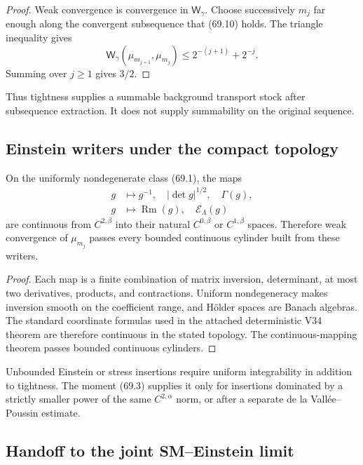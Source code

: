 \documentclass[11pt]{article}
\theoremstyle{remark}
\begin{document}
\begin{proof}
Weak convergence is convergence in
\({\mathsf W}_\gamma\).  Choose successively \(m_j\) far enough along
the convergent subsequence that (69.10) holds.  The triangle
inequality gives
\[
 {\mathsf W}_\gamma(\mu_{m_{j+1}},\mu_{m_j})
 \leq2^{-(j+1)}+2^{-j}.
\]
Summing over \(j\geq1\) gives \(3/2\).
\end{proof}

Thus tightness supplies a summable background transport stock after
subsequence extraction.  It does not supply summability on the
original sequence.

\subsection{Einstein writers under the compact topology}

On the uniformly nondegenerate class (69.1), the maps
\begin{align}
 g&\longmapsto g^{-1},\quad
 |\det g|^{1/2},\quad
 \Gamma(g),                                      \tag{69.12}\\
 g&\longmapsto
 \operatorname{Rm}(g),\quad
 \mathscr E_\Lambda(g)                            \tag{69.13}
\end{align}
are continuous from \(C^{2,\beta}\) into their natural
\(C^{0,\beta}\) or \(C^{1,\beta}\) spaces.  Therefore weak
convergence of \(\mu_{m_j}\) passes every bounded continuous
cylinder built from these writers.

\begin{proof}
Each map is a finite combination of matrix inversion, determinant,
at most two derivatives, products, and contractions.  Uniform
nondegeneracy makes inversion smooth on the coefficient range, and
Hölder spaces are Banach algebras.  The standard coordinate formulas
used in the attached deterministic V34 theorem are therefore
continuous in the stated topology.  The continuous-mapping theorem
passes bounded continuous cylinders.
\end{proof}

Unbounded Einstein or stress insertions require uniform
integrability in addition to tightness.  The moment (69.3) supplies
it only for insertions dominated by a strictly smaller power of the
same \(C^{2,\alpha}\) norm, or after a separate de la
Vall\'ee--Poussin estimate.

\subsection{Handoff to the joint SM--Einstein limit}
\end{document}
